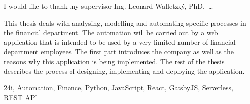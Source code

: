 \documentclass[12pt,oneside]{fithesis2}
\begin{document}
  \FrontMatter
    \ThesisTitlePage
    \begin{ThesisDeclaration}
      \DeclarationText
      \AdvisorName
    \end{ThesisDeclaration}
    \begin{ThesisThanks}
      I would like to thank my supervisor Ing. Leonard Walletzký, PhD. \,\dots
    \end{ThesisThanks}
    \begin{ThesisAbstract}
      This thesis deals with analysing, modelling and automating specific processes in the financial department. The automation will be carried out by a web application that is intended to be used by a very limited number of financial department employees. The first part introduces the company as well as the reasons why this application is being implemented. The rest of the thesis describes the process of designing, implementing and deploying the application.
    \end{ThesisAbstract}
    \begin{ThesisKeyWords}
      24i, Automation, Finance, Python, JavaScript, React, GatsbyJS, Serverless, REST API
    \end{ThesisKeyWords}
    \tableofcontents
  
  \MainMatter
\end{document}
